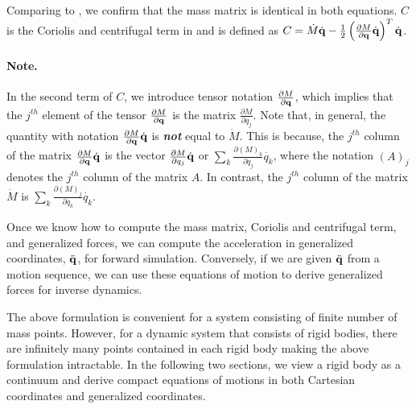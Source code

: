 Comparing  to ,
we confirm that the mass matrix is identical in both equations. $C$ is
the Coriolis and centrifugal term in  and is
defined as $C = \dot{M} \dot{\mathbf{q}} - \frac{1}{2}\left( \frac{\partial M}{\partial  \mathbf{q}} \dot{\mathbf{q}} \right)^T \dot{\mathbf{q}}$. 

\paragraph{Note.} In the second term of $C$, we introduce tensor notation $\frac{\partial M}{\partial \mathbf{q}}$, which implies that the $j^{th}$ element of the tensor $\frac{\partial M}{\partial \mathbf{q}}$ is the matrix $\frac{\partial M}{\partial {q}_j}$. Note that, in general, the quantity with notation $\frac{\partial M}{\partial \mathbf{q}} \dot{\mathbf{q}}$ is \textbf{\emph{not}} equal to $\dot{M}$. This is because, the $j^{th}$ column of the matrix $\frac{\partial M}{\partial \mathbf{q}} \dot{\mathbf{q}}$ is the vector $\frac{\partial M}{\partial q_j} \dot{\mathbf{q}}$ or $\sum_k \frac{\partial (M)_k}{\partial q_j} \dot{{q}_k}$, where the notation $(A)_j$ denotes the $j^{th}$ column of the matrix $A$. In contrast, the $j^{th}$ column of the matrix $\dot{M}$ is $\sum_k \frac{\partial (M)_j}{\partial q_k} \dot{{q}_k}$.

Once we know how to compute the mass matrix, Coriolis and centrifugal
term, and generalized forces, we can compute the acceleration in
generalized coordinates, $\ddot{\mathbf{q}}$, for forward
simulation. Conversely, if we are given $\ddot{\mathbf{q}}$ from a motion
sequence, we can use these equations of motion to derive generalized
forces for inverse dynamics. 

The above formulation is convenient for a system consisting of finite
number of mass points. However, for a dynamic system that consists of
rigid bodies, there are infinitely many points contained in each rigid
body making the above formulation intractable. In the following two
sections, we view a rigid body as a continuum and derive compact
equations of motions in both Cartesian coordinates and generalized
coordinates.

\newpage
